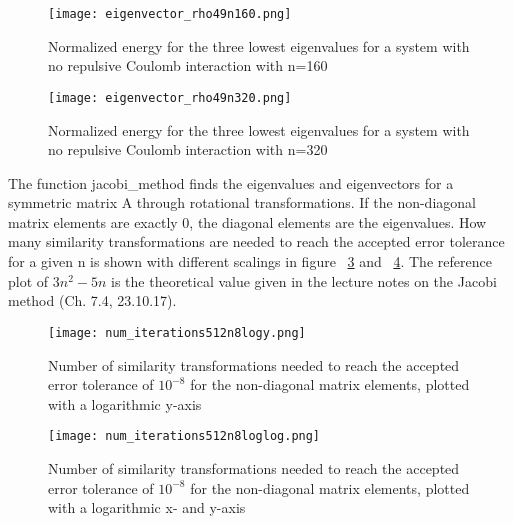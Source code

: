 \FloatBarrier
\begin{figure}[!ht]
\centering
\FloatBarrier
\texttt{[image: eigenvector\_rho49n160.png]}

\caption{Normalized energy for the three lowest eigenvalues for a system with no repulsive Coulomb interaction with n=160}
\label{fig:Eigenvalue_states_n_160}
\end{figure}
\FloatBarrier


\FloatBarrier
\begin{figure}[!ht]
\centering
\FloatBarrier
\texttt{[image: eigenvector\_rho49n320.png]}

\caption{Normalized energy for the three lowest eigenvalues for a system with no repulsive Coulomb interaction with n=320}
\label{fig:Eigenvalue_states_n_320}
\end{figure}
\FloatBarrier


The function jacobi\_method finds the eigenvalues and eigenvectors for a symmetric matrix A through rotational transformations.
If the non-diagonal matrix elements are exactly 0, the diagonal elements are the eigenvalues. How many similarity transformations are needed to reach the accepted error tolerance for a given n is shown with different scalings in figure ~\ref{fig:Similarity_transformations_threshold_logy} and ~\ref{fig:Similarity_transformations_threshold_loglog}. The reference plot of $3n^2-5n$ is the theoretical value given in the lecture notes on the Jacobi method (Ch. 7.4, 23.10.17).

\FloatBarrier
\begin{figure}[!ht]
\centering
\FloatBarrier
\texttt{[image: num\_iterations512n8logy.png]}

\caption{Number of similarity transformations needed to reach the accepted error tolerance of $10^{-8}$ for the non-diagonal matrix elements, plotted with a logarithmic y-axis}
\label{fig:Similarity_transformations_threshold_logy}
\end{figure}
\FloatBarrier



\FloatBarrier
\begin{figure}[!ht]
\centering
\FloatBarrier
\texttt{[image: num\_iterations512n8loglog.png]}

\caption{Number of similarity transformations needed to reach the accepted error tolerance of $10^{-8}$ for the non-diagonal matrix elements, plotted with a logarithmic x- and y-axis}
\label{fig:Similarity_transformations_threshold_loglog}
\end{figure}
\FloatBarrier


